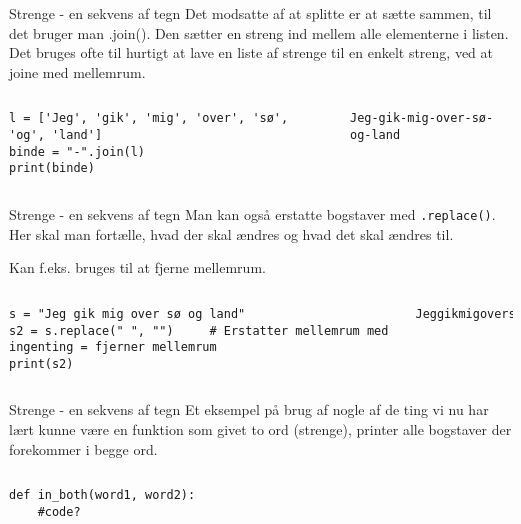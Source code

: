 \documentclass[main.tex]{subfiles}
\begin{document}
\begin{frame}[fragile]{Strenge - en sekvens af tegn}
	Det modsatte af at splitte er at sætte sammen, til det bruger man .join(). Den sætter en streng ind mellem alle elementerne i listen. Det bruges ofte til hurtigt at lave en liste af strenge til en enkelt streng, ved at joine med mellemrum.
	\begin{columns}
		\begin{lstlisting}[style=python]
l = ['Jeg', 'gik', 'mig', 'over', 'sø', 'og', 'land']
binde = "-".join(l)
print(binde)
		\end{lstlisting}
		
		\pause
		\begin{lstlisting}[style=python]
Jeg-gik-mig-over-sø-og-land
		\end{lstlisting}
	\end{columns}
\end{frame}

\begin{frame}[fragile]{Strenge - en sekvens af tegn}
	Man kan også erstatte bogstaver med \texttt{.replace()}. Her skal man fortælle, hvad der skal ændres og hvad det skal ændres til. 
	
	\pause
	Kan f.eks. bruges til at fjerne mellemrum.
	
	\begin{columns}
		\column{0.4\textwidth}
		\begin{lstlisting}[style=python]
s = "Jeg gik mig over sø og land"
s2 = s.replace(" ", "")		# Erstatter mellemrum med ingenting = fjerner mellemrum
print(s2)
		\end{lstlisting}
		
		\pause
		\column{0.4\textwidth}
		\begin{lstlisting}[style=python]
Jeggikmigoversøogland
		\end{lstlisting}
	\end{columns}
\end{frame}

\begin{frame}[fragile]{Strenge - en sekvens af tegn}
	Et eksempel på brug af nogle af de ting vi nu har lært kunne være en funktion som givet to ord (strenge), printer alle bogstaver der forekommer i begge ord.
	\begin{columns}
		\column{0.45\textwidth}
		\begin{lstlisting}[style=python]
def in_both(word1, word2):
	#code?
		\end{lstlisting}
		
		\pause
		
	\end{columns}
\end{frame}
\end{document}
